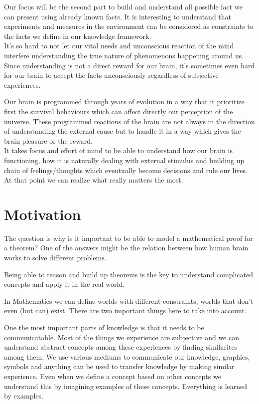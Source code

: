 \documentclass{article}
\begin{document}
Our focus will be the second part to build and understand all possible fact we can present using already known facts. It is interesting to understand that experiments and measures in the environment can be considered as constraints to the facts we define in our knowledge framework.
\\

It’s so hard to not let our vital needs and unconscious reaction of the mind interfere understanding the true nature of phenomenons happening around us.\\

Since understanding is not a direct reward for our brain, it’s sometimes even hard for our brain to accept the facts unconsciously regardless of subjective experiences.

Our brain is programmed through years of evolution in a way that it prioritize first the survival behaviours which can affect directly our perception of the universe. These programmed reactions of the brain are not always in the direction of understanding the external cause but to handle it in a way which gives the brain pleasure or the reward.\\
It takes focus and effort of mind to be able to understand how our brain is functioning, how it is naturally dealing with external stimulus and building up chain of feelings/thoughts which eventually become decisions and rule our lives. At that point we can realize what really matters the most.

\section{Motivation}
The question is why is it important to be able to model a mathematical proof for a theorem?
One of the answers might be the relation between how human brain works to solve different problems.

Being able to reason and build up theorems is the key to understand complicated concepts and apply it in the real world. 

In Mathematics we can define worlds with different constraints, worlds that don't even (but can) exist. There are two important things here to take into account. 


One the most important parts of knowledge is that it needs to be communicatable. Most of the things we experience are subjective and we can understand abstract concepts among these experiences by finding similarites among them. We use various mediums to communicate our knowledge, graphics, symbols and anything can be used to transfer knowledge by making similar experience. Even when we define a concept based on other concepts we understand this by imagining examples of these concepts. Everything is learned by examples.
\end{document}
